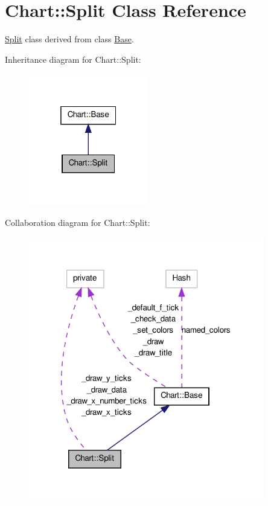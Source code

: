 \hypertarget{classChart_1_1Split}{
\section{Chart::Split Class Reference}
\label{classChart_1_1Split}
}


\hyperlink{classChart_1_1Split}{Split} class derived from class \hyperlink{classChart_1_1Base}{Base}.  




Inheritance diagram for Chart::Split:\nopagebreak
\begin{figure}[H]
\begin{center}
\leavevmode
\includegraphics[width=148pt]{classChart_1_1Split__inherit__graph}
\end{center}
\end{figure}


Collaboration diagram for Chart::Split:\nopagebreak
\begin{figure}[H]
\begin{center}
\leavevmode
\includegraphics[width=291pt]{classChart_1_1Split__coll__graph}
\end{center}
\end{figure}
